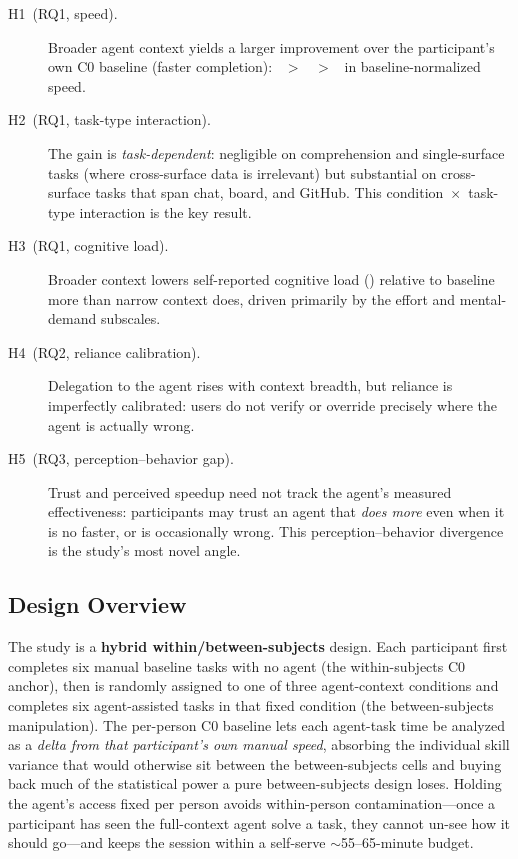 \begin{description}
  \item[H1~(RQ1, speed).]
    Broader agent context yields a larger improvement over the participant's own
    C0 baseline (faster completion): \CIII\ $>$ \CII\ $>$ \CI\ in
    baseline-normalized speed.

  \item[H2~(RQ1, task-type interaction).]
    The gain is \emph{task-dependent}: negligible on comprehension and
    single-surface tasks (where cross-surface data is irrelevant) but
    substantial on cross-surface tasks that span chat, board, and GitHub. This
    condition~$\times$~task-type interaction is the key result.

  \item[H3~(RQ1, cognitive load).]
    Broader context lowers self-reported cognitive load (\NASATLX) relative to
    baseline more than narrow context does, driven primarily by the effort and
    mental-demand subscales.

  \item[H4~(RQ2, reliance calibration).]
    Delegation to the agent rises with context breadth, but reliance is
    imperfectly calibrated: users do not verify or override precisely where the
    agent is actually wrong.

  \item[H5~(RQ3, perception--behavior gap).]
    Trust and perceived speedup need not track the agent's measured
    effectiveness: participants may trust an agent that \emph{does more} even
    when it is no faster, or is occasionally wrong. This perception--behavior
    divergence is the study's most novel angle.
\end{description}

\subsection{Design Overview}
\label{sec:study:design}

The study is a \textbf{hybrid within/between-subjects} design. Each participant
first completes six manual baseline tasks with no agent (the within-subjects C0
anchor), then is randomly assigned to one of three agent-context conditions and
completes six agent-assisted tasks in that fixed condition (the between-subjects
manipulation). The per-person C0 baseline lets each agent-task time be analyzed
as a \emph{delta from that participant's own manual speed}, absorbing the
individual skill variance that would otherwise sit between the between-subjects
cells and buying back much of the statistical power a pure between-subjects
design loses. Holding the agent's access fixed per person avoids within-person
contamination---once a participant has seen the full-context agent solve a task,
they cannot un-see how it should go---and keeps the session within a self-serve
$\sim$55--65-minute budget.


